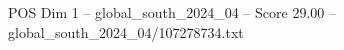 \begin{textsample}{POS Dim 1 – global\_south\_2024\_04 – Score 29.00 – global\_south\_2024\_04/107278734.txt}
\end{textsample}

